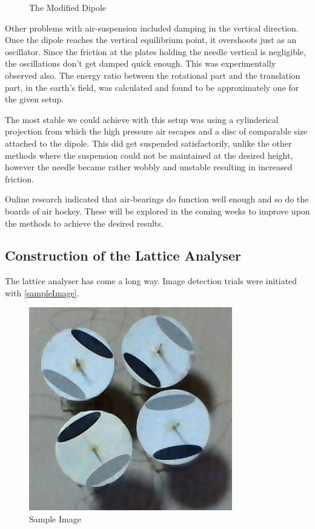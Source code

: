 \begin{enumerate}
\begin{figure}[bth]
\begin{center}
						\end{center}
					\caption[The Modified Dipole]{The Modified Dipole}
					\label{theLightDipole}
					\end{figure}						
					\par
					Other problems with air-suspension included damping in the vertical direction. Once the dipole reaches the vertical equilibrium point, it overshoots just as an oscillator. Since the friction at the plates holding the needle vertical is negligible, the oscillations don't get damped quick enough. This was experimentally observed also. The energy ratio between the rotational part and the translation part, in the earth's field, was calculated and found to be approximately one for the given setup.
					\par
					The most stable we could achieve with this setup was using a cylinderical projection from which the high pressure air escapes and a disc of comparable size attached to the dipole. This did get suspended satisfactorily, unlike the other methods where the suspension could not be maintained at the desired height, however the needle became rather wobbly and unstable resulting in increased friction.
					\par
					Online research indicated that air-bearings do function well enough and so do the boards of air hockey. These will be explored in the coming weeks to improve upon the methods to achieve the desired results.
		\end{enumerate}
	\subsection{Construction of the Lattice Analyser}
		The lattice analyser has come a long way. Image detection trials were initiated with \autoref{sampleImage}. 
		\begin{figure}[bth]
			\begin{center}
				\includegraphics[width=0.7\linewidth]{../../latticeAnalyser/picture002.jpg}
			\end{center}
		\caption[Sample Image]{Sample Image}
		\label{sampleImage}
		\end{figure}

